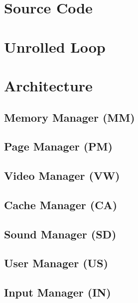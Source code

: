 \documentclass[book.tex]{subfiles}
\begin{document}
\section{Source Code}
\section{Unrolled Loop}
\section{Architecture}
\subsection{Memory Manager (MM)}
\subsection{Page Manager (PM)}
\subsection{Video Manager (VW)}
\subsection{Cache Manager (CA)}
\subsection{Sound Manager (SD)}
\subsection{User Manager (US)}
\subsection{Input Manager (IN)}
\end{document}
